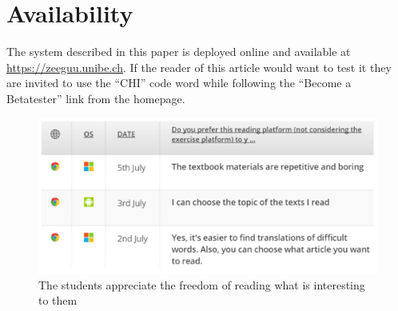 \section{Availability}
The system described in this paper is deployed online and available at \url{https://zeeguu.unibe.ch}. If the reader of this article would want to test it they are invited to use the ``CHI'' code word while following the  ``Become a Betatester'' link from the homepage.

\begin{figure}[h!]
\centering
  \includegraphics[width=0.9\columnwidth]{figures/opinion_on_reading_platform}
  \caption{The students appreciate the freedom of reading what is interesting to them }
\end{figure}









